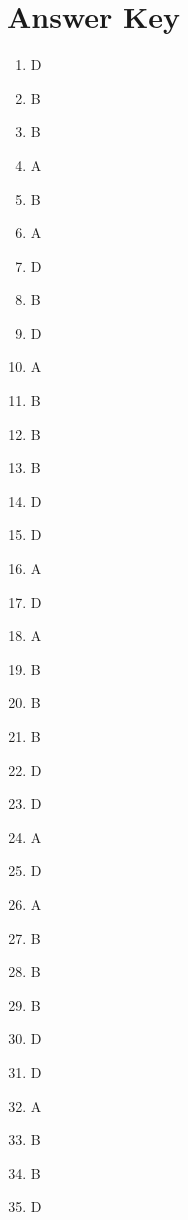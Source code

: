 \documentclass{article}
\begin{document}
\section*{Answer Key}
\begin{enumerate}
    \item D
    \item B
    \item B
    \item A
    \item B
    \item A
    \item D
    \item B
    \item D
    \item A
    \item B
    \item B
    \item B
    \item D
    \item D
    \item A
    \item D
    \item A
    \item B
    \item B
    \item B
    \item D
    \item D
    \item A
    \item D
    \item A
    \item B
    \item B
    \item B
    \item D
    \item D
    \item A
    \item B
    \item B
    \item D
\end{enumerate}
\end{document}
